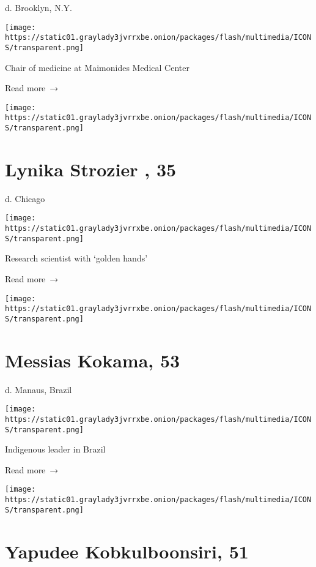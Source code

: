 d. Brooklyn, N.Y.

\texttt{[image: https://static01.graylady3jvrrxbe.onion/packages/flash/multimedia/ICONS/transparent.png]}

Chair of medicine at Maimonides Medical Center

 Read more~→

\href{https://www.nytimes3xbfgragh.onion/2020/06/19/obituaries/lynika-strozier-dead-coronavirus.html}{}

\texttt{[image: https://static01.graylady3jvrrxbe.onion/packages/flash/multimedia/ICONS/transparent.png]}

\hypertarget{lynika-strozier--35}{%
\section{Lynika Strozier , 35}\label{lynika-strozier--35}}

d. Chicago

\texttt{[image: https://static01.graylady3jvrrxbe.onion/packages/flash/multimedia/ICONS/transparent.png]}

Research scientist with `golden hands'

 Read more~→

\href{https://www.nytimes3xbfgragh.onion/2020/06/18/obituaries/messias-kokama-dead-coronavirus.html}{}

\texttt{[image: https://static01.graylady3jvrrxbe.onion/packages/flash/multimedia/ICONS/transparent.png]}

\hypertarget{messias-kokama-53}{%
\section{Messias Kokama, 53}\label{messias-kokama-53}}

d. Manaus, Brazil

\texttt{[image: https://static01.graylady3jvrrxbe.onion/packages/flash/multimedia/ICONS/transparent.png]}

Indigenous leader in Brazil

 Read more~→

\href{https://www.nytimes3xbfgragh.onion/2020/06/17/obituaries/yupadee-kobkulboonsiri-dead-coronavirus.html}{}

\texttt{[image: https://static01.graylady3jvrrxbe.onion/packages/flash/multimedia/ICONS/transparent.png]}

\hypertarget{yapudee-kobkulboonsiri-51}{%
\section{Yapudee Kobkulboonsiri, 51}\label{yapudee-kobkulboonsiri-51}}

